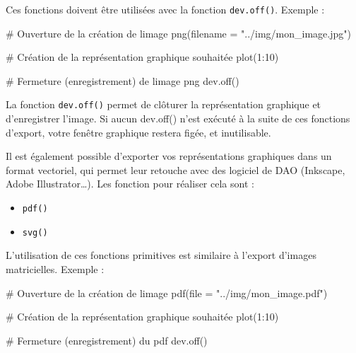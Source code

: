 \documentclass[
  letterpaper,
  DIV=11,
  numbers=noendperiod]{scrartcl}
\newenvironment{Shaded}{\begin{snugshade}}{\end{snugshade}}
\newcommand{\AttributeTok}[1]{\textcolor[rgb]{0.40,0.45,0.13}{#1}}
\newcommand{\CommentTok}[1]{\textcolor[rgb]{0.37,0.37,0.37}{#1}}
\newcommand{\DecValTok}[1]{\textcolor[rgb]{0.68,0.00,0.00}{#1}}
\newcommand{\FunctionTok}[1]{\textcolor[rgb]{0.28,0.35,0.67}{#1}}
\newcommand{\NormalTok}[1]{\textcolor[rgb]{0.00,0.23,0.31}{#1}}
\newcommand{\SpecialCharTok}[1]{\textcolor[rgb]{0.37,0.37,0.37}{#1}}
\newcommand{\StringTok}[1]{\textcolor[rgb]{0.13,0.47,0.30}{#1}}
\providecommand{\tightlist}{%
  \setlength{\itemsep}{0pt}\setlength{\parskip}{0pt}}\usepackage{longtable,booktabs,array}
\begin{document}
Ces fonctions doivent être utilisées avec la fonction
\texttt{dev.off()}. Exemple :

\begin{Shaded}
\begin{Highlighting}[]
\CommentTok{\# Ouverture de la création de l\textquotesingle{}image}
\FunctionTok{png}\NormalTok{(}\AttributeTok{filename =} \StringTok{"../img/mon\_image.jpg"}\NormalTok{)}

\CommentTok{\# Création de la représentation graphique souhaitée}
\FunctionTok{plot}\NormalTok{(}\DecValTok{1}\SpecialCharTok{:}\DecValTok{10}\NormalTok{)}

\CommentTok{\# Fermeture (enregistrement) de l\textquotesingle{}image png}
\FunctionTok{dev.off}\NormalTok{()}
\end{Highlighting}
\end{Shaded}

\begin{tcolorbox}[enhanced jigsaw, opacityback=0, bottomrule=.15mm, titlerule=0mm, left=2mm, bottomtitle=1mm, title=\textcolor{quarto-callout-important-color}{\faExclamation}\hspace{0.5em}{Important}, opacitybacktitle=0.6, breakable, colbacktitle=quarto-callout-important-color!10!white, leftrule=.75mm, colframe=quarto-callout-important-color-frame, rightrule=.15mm, toprule=.15mm, coltitle=black, arc=.35mm, colback=white, toptitle=1mm]

La fonction \texttt{dev.off()} permet de clôturer la représentation
graphique et d'enregistrer l'image. Si aucun dev.off() n'est exécuté à
la suite de ces fonctions d'export, votre fenêtre graphique restera
figée, et inutilisable.

\end{tcolorbox}

Il est également possible d'exporter vos représentations graphiques dans
un format vectoriel, qui permet leur retouche avec des logiciel de DAO
(Inkscape, Adobe Illustrator\ldots). Les fonction pour réaliser cela
sont :

\begin{itemize}
\tightlist
\item
  \texttt{pdf()}
\item
  \texttt{svg()}
\end{itemize}

L'utilisation de ces fonctions primitives est similaire à l'export
d'images matricielles. Exemple :

\begin{Shaded}
\begin{Highlighting}[]
\CommentTok{\# Ouverture de la création de l\textquotesingle{}image}
\FunctionTok{pdf}\NormalTok{(}\AttributeTok{file =} \StringTok{"../img/mon\_image.pdf"}\NormalTok{)}

\CommentTok{\# Création de la représentation graphique souhaitée}
\FunctionTok{plot}\NormalTok{(}\DecValTok{1}\SpecialCharTok{:}\DecValTok{10}\NormalTok{)}

\CommentTok{\# Fermeture (enregistrement) du pdf}
\FunctionTok{dev.off}\NormalTok{()}
\end{Highlighting}
\end{Shaded}
\end{document}
